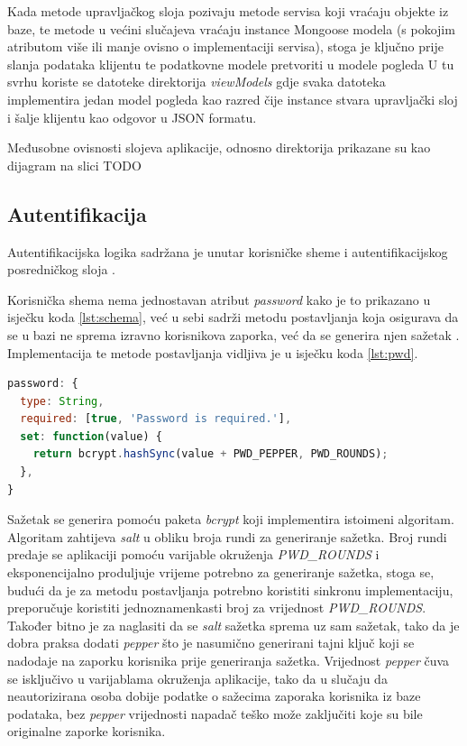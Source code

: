 \documentclass[times, utf8, diplomski, numeric]{fer}
\newcommand{\razmakp}{\vspace{18pt}}
\newcommand{\razmaks}{\vspace{10pt}}
\begin{document}
Kada metode upravljačkog sloja pozivaju metode servisa koji vraćaju objekte iz baze, te metode u većini slučajeva vraćaju instance Mongoose modela (s pokojim atributom više ili manje ovisno o implementaciji servisa), stoga je ključno prije slanja podataka klijentu te podatkovne modele  pretvoriti u modele pogleda 
U tu svrhu koriste se datoteke direktorija \emph{viewModels} gdje svaka datoteka implementira jedan model pogleda kao razred čije instance stvara upravljački sloj i šalje klijentu kao odgovor u JSON formatu.

\razmakp

Međusobne ovisnosti slojeva aplikacije, odnosno direktorija prikazane su kao dijagram na slici TODO


\razmaks
\subsection{Autentifikacija} \label{sec:auth}

Autentifikacijska logika sadržana je unutar korisničke sheme i autentifikacijskog posredničkog sloja .

Korisnička shema nema jednostavan atribut \emph{password} kako je to prikazano u isječku koda \ref{lst:schema}, već u sebi sadrži metodu postavljanja  koja osigurava da se u bazi ne sprema izravno korisnikova zaporka, već da se generira njen sažetak .
Implementacija te metode postavljanja vidljiva je u isječku koda \ref{lst:pwd}.

\razmakp %
\begin{lstlisting}[language=JavaScript, caption={Attribut \emph{password} od sheme Korisnik}, label={lst:pwd}]
password: {
  type: String,
  required: [true, 'Password is required.'],
  set: function(value) {
    return bcrypt.hashSync(value + PWD_PEPPER, PWD_ROUNDS);
  },
}
\end{lstlisting}
\razmaks

Sažetak se generira pomoću paketa \emph{bcrypt} koji implementira istoimeni algoritam.
Algoritam zahtijeva \emph{salt} u obliku broja rundi za generiranje sažetka.
Broj rundi predaje se aplikaciji pomoću varijable okruženja \emph{PWD\_ROUNDS} i eksponencijalno produljuje vrijeme potrebno za generiranje sažetka, stoga se, budući da je za metodu postavljanja potrebno koristiti sinkronu implementaciju, preporučuje koristiti jednoznamenkasti broj za vrijednost \emph{PWD\_ROUNDS}\citep{bcrypt}.
Također bitno je za naglasiti da se \emph{salt} sažetka sprema uz sam sažetak, tako da je dobra praksa dodati \emph{pepper} što je nasumično generirani tajni ključ koji se nadodaje na zaporku korisnika prije generiranja sažetka.
Vrijednost \emph{pepper} čuva se isključivo u varijablama okruženja aplikacije, tako da u slučaju da neautorizirana osoba dobije podatke o sažecima zaporaka korisnika iz baze podataka, bez \emph{pepper} vrijednosti napadač teško može zaključiti koje su bile originalne zaporke korisnika.
\end{document}
